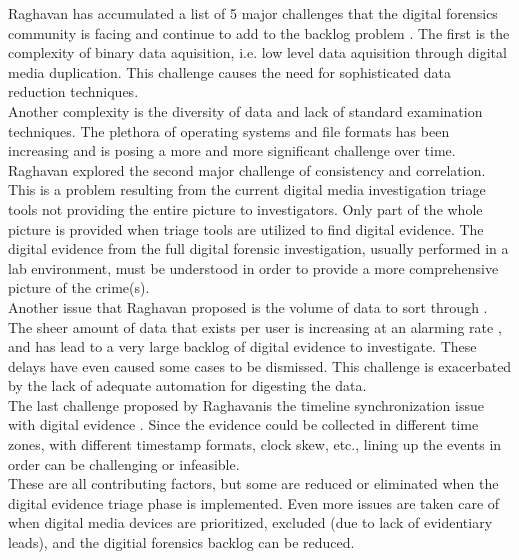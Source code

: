 \documentclass[12pt]{article}
\begin{document}
Raghavan has accumulated a list of 5 major challenges
that the digital forensics community is facing and continue to add to the backlog
problem \cite{raghavan2013digital}.  The first is the complexity of binary data
aquisition, i.e. low level
data aquisition through digital media duplication.  This challenge causes the need
for sophisticated data reduction techniques.\\

Another complexity is the diversity of data and lack of standard examination
techniques.  The plethora of operating systems and file formats has been
increasing and is posing a more and more significant challenge over time.\\

Raghavan explored the second major challenge of consistency and correlation.  This is a
problem resulting from the current digital media investigation triage tools not
providing the entire picture to investigators.  Only part of the whole picture
is provided when triage tools are utilized to find digital evidence.  The
digital evidence from the full digital forensic investigation, usually performed 
in a lab environment, must be understood in order to provide a more comprehensive
picture of the crime(s).\\

Another issue that Raghavan proposed is the volume of data to sort
through \cite{raghavan2013digital}.  The sheer amount of data that exists per user is increasing
at an alarming rate \cite{rogers2006computer}, and has lead to a very large backlog of digital
evidence to investigate.  These delays have even caused some cases to be dismissed.
This challenge is exacerbated by the lack of adequate automation for digesting the
data.\\

The last challenge proposed by Raghavanis the timeline synchronization issue with
digital evidence \cite{raghavan2013digital}.  Since the evidence could be
collected in different time zones, with different timestamp formats, clock skew,
etc., lining up the events in order can be challenging or infeasible.\\

These are all contributing factors, but some are reduced or eliminated when 
the digital evidence triage phase is implemented.  Even more issues are taken care
of when digital media devices are prioritized, excluded (due to lack of
evidentiary leads), and the digitial forensics backlog can be reduced.\\
\end{document}
